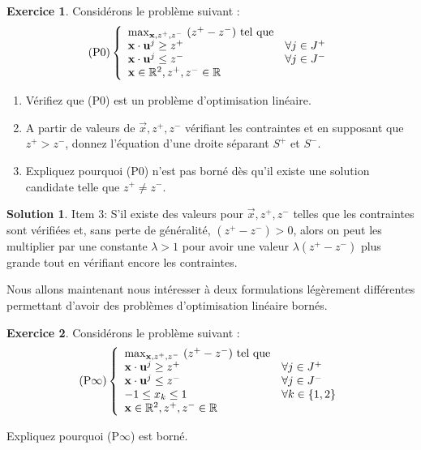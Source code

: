 \documentclass[a4paper,francais]{article}
\newcommand{\R}{{\ensuremath\mathbb{R}}}
\theoremstyle{definition}
\newtheorem{exercice}{Exercice}[section]
\newtheorem*{solution}{Solution}
\begin{document}
\begin{exercice}
  Considérons le problème suivant : 
  \[
  \text{(P0)}
  \left\{
  \begin{array}{ll}
    \max_{\vec{x},z^+,z^-} \ (z^+ - z^-) \ \text{tel que} & \\
    \vec{x} \cdot \vec{u}^j \geq z^+ & \forall j \in J^+ \\ 
    \vec{x} \cdot \vec{u}^j \leq z^- & \forall j \in J^- \\
    \vec{x} \in \R^2, z^+, z^- \in \R \\
  \end{array}
  \right.
  \]

  \begin{enumerate}
  \item Vérifiez que (P0) est un problème d'optimisation linéaire.
  \item A partir de valeurs de $\vec{x}, z^+, z^-$ vérifiant les
    contraintes et en supposant que $z^+ > z^-$, donnez l'équation
    d'une droite séparant $S^+$ et $S^-$. 
  \item Expliquez pourquoi (P0) n'est pas borné dès qu'il existe
    une solution candidate telle que $z^+ \neq z^-$.
  \end{enumerate}

\end{exercice}

\begin{solution}
  Item 3: 
  S'il existe des valeurs pour $\vec{x}, z^+, z^-$ telles que
  les contraintes sont vérifiées et, sans perte de généralité,
  $(z^+ - z^-) > 0$, alors on peut les multiplier par une
  constante $\lambda > 1$ pour avoir une valeur $\lambda(z^+ - z^-)$ plus
  grande tout en vérifiant encore les contraintes. 
\end{solution}

Nous allons maintenant nous intéresser à deux formulations
légèrement différentes permettant d'avoir des problèmes
d'optimisation linéaire bornés.

\begin{exercice}
  Considérons le problème suivant : 
  \[
  \text{(P$\infty$)}
  \left\{
  \begin{array}{ll}
    \max_{\vec{x},z^+,z^-} \ (z^+ - z^-) \ \text{tel que} & \\
    \vec{x} \cdot \vec{u}^j \geq z^+ & \forall j \in J^+ \\ 
    \vec{x} \cdot \vec{u}^j \leq z^- & \forall j \in J^- \\
    -1 \leq x_k \leq 1 & \forall k \in \{1, 2\} \\
    \vec{x} \in \R^2, z^+, z^- \in \R \\
  \end{array}
  \right.
  \]

  Expliquez pourquoi (P$\infty$) est borné. 
\end{exercice}
\end{document}
